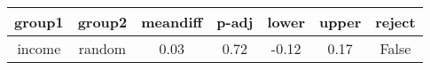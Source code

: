 \begin{tabular}{|c|c|c|c|c|c|c|}
\toprule
 group1 &  group2 &  meandiff &  p-adj &  lower &  upper &  reject \\
\midrule
 income &  random &      0.03 &   0.72 &  -0.12 &   0.17 &   False \\
\bottomrule
\end{tabular}
